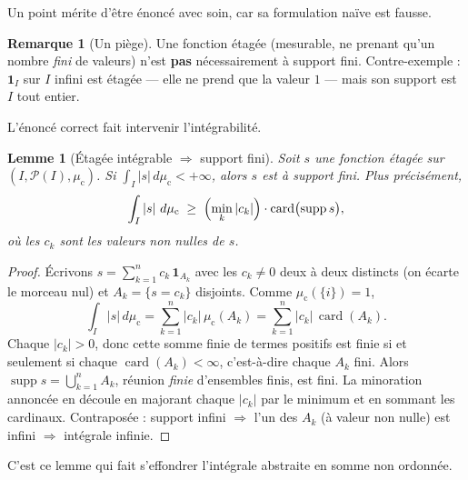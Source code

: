 \documentclass[11pt,a4paper]{article}
\theoremstyle{plain}
\newtheorem{lemme}[theoreme]{Lemme}
\theoremstyle{definition}
\newtheorem{remarque}[theoreme]{Remarque}
\newcommand{\abs}[1]{\left\lvert #1 \right\rvert}
\newcommand{\card}{\operatorname{card}}
\newcommand{\supp}{\operatorname{supp}}
\newcommand{\muc}{\mu_{\mathrm{c}}}
\begin{document}
Un point mérite d'être énoncé avec soin, car sa formulation naïve est fausse.

\begin{remarque}[Un piège]
Une fonction étagée (mesurable, ne prenant qu'un nombre \emph{fini} de valeurs)
n'est \textbf{pas} nécessairement à support fini. Contre-exemple :
$\mathbf{1}_I$ sur $I$ infini est étagée — elle ne prend que la valeur $1$ — mais
son support est $I$ tout entier.
\end{remarque}

L'énoncé correct fait intervenir l'intégrabilité.

\begin{lemme}[Étagée intégrable $\Rightarrow$ support fini]\label{lem:etagee}
Soit $s$ une fonction étagée sur $(I, \mathscr{P}(I), \muc)$. Si
$\int_I \abs{s}\, d\muc < +\infty$, alors $s$ est à support fini. Plus
précisément,
\[
  \int_I \abs{s}\, d\muc \;\ge\; \Bigl(\min_{k} \abs{c_k}\Bigr)
     \cdot \card\bigl(\supp s\bigr),
\]
où les $c_k$ sont les valeurs non nulles de $s$.
\end{lemme}

\begin{proof}
Écrivons $s = \sum_{k=1}^{n} c_k \, \mathbf{1}_{A_k}$ avec les $c_k \neq 0$ deux à
deux distincts (on écarte le morceau nul) et $A_k = \{s = c_k\}$ disjoints. Comme
$\muc(\{i\}) = 1$,
\[
  \int_I \abs{s}\, d\muc = \sum_{k=1}^{n} \abs{c_k}\, \muc(A_k)
     = \sum_{k=1}^{n} \abs{c_k}\, \card(A_k).
\]
Chaque $\abs{c_k} > 0$, donc cette somme finie de termes positifs est finie si et
seulement si chaque $\card(A_k) < \infty$, c'est-à-dire chaque $A_k$ fini. Alors
$\supp s = \bigcup_{k=1}^{n} A_k$, réunion \emph{finie} d'ensembles finis, est
fini. La minoration annoncée en découle en majorant chaque $\abs{c_k}$ par le
minimum et en sommant les cardinaux. Contraposée : support infini $\Rightarrow$
l'un des $A_k$ (à valeur non nulle) est infini $\Rightarrow$ intégrale infinie.
\end{proof}

C'est ce lemme qui fait s'effondrer l'intégrale abstraite en somme non ordonnée.
\end{document}
